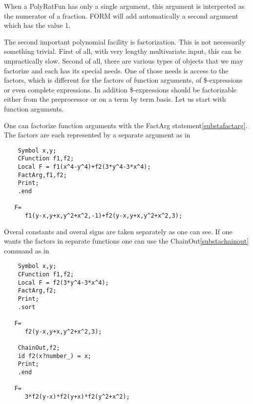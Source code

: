 \noindent When a PolyRatFun has only a single argument, this argument is 
interpreted as the numerator of a fraction. FORM will add automatically a 
second argument which has the value 1.

\noindent The second important polynomial facility is factorization. This 
is not necessarily something trivial. First of all, with very lengthy 
multivariate input, this can be unpractically slow. Second of all, there 
are various types of objects that we may factorize and each has its special 
needs. One of those needs is access to the factors, which is different for 
the factors of function arguments, of \$-expressions or even complete 
expressions. In addition \$-expressions should be factorizable either from 
the preprocessor or on a term by term basis. Let us start with function 
arguments.

\noindent One can factorize function arguments with the FactArg 
statement\ref{substafactarg}. The factors are each represented by a 
separate argument as in
\begin{verbatim}
    Symbol x,y;
    CFunction f1,f2;
    Local F = f1(x^4-y^4)+f2(3*y^4-3*x^4);
    FactArg,f1,f2;
    Print;
    .end

   F=
      f1(y-x,y+x,y^2+x^2,-1)+f2(y-x,y+x,y^2+x^2,3);
\end{verbatim}
Overal constants and overal signs are taken separately as one can see. If 
one wants the factors in separate functions one can use the 
ChainOut\ref{substachainout} command as in
\begin{verbatim}
    Symbol x,y;
    CFunction f1,f2;
    Local F = f2(3*y^4-3*x^4);
    FactArg,f2;
    Print;
    .sort

   F=
      f2(y-x,y+x,y^2+x^2,3);

    ChainOut,f2;
    id f2(x?number_) = x;
    Print;
    .end

   F=
      3*f2(y-x)*f2(y+x)*f2(y^2+x^2);
\end{verbatim}

